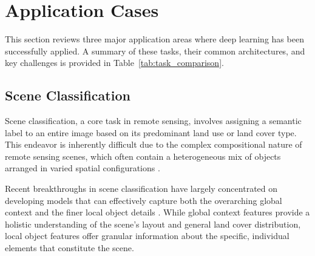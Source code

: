 \documentclass[12pt,a4paper]{article}
\begin{document}
\section{Application Cases}
\label{sec:applications}

This section reviews three major application areas where deep learning has been successfully applied. A summary of these tasks, their common architectures, and key challenges is provided in Table~\ref{tab:task_comparison}.

\begin{table}[h!]
\centering
\caption{Comparison of Major Deep Learning Tasks in Remote Sensing.}
\label{tab:task_comparison}
\end{table}


\subsection{Scene Classification}
Scene classification, a core task in remote sensing, involves assigning a semantic label to an entire image based on its predominant land use or land cover type. This endeavor is inherently difficult due to the complex compositional nature of remote sensing scenes, which often contain a heterogeneous mix of objects arranged in varied spatial configurations \cite{xia2017aid}.

Recent breakthroughs in scene classification have largely concentrated on developing models that can effectively capture both the overarching global context and the finer local object details \cite{zeng2018improving}. While global context features provide a holistic understanding of the scene's layout and general land cover distribution, local object features offer granular information about the specific, individual elements that constitute the scene.
\end{document}
